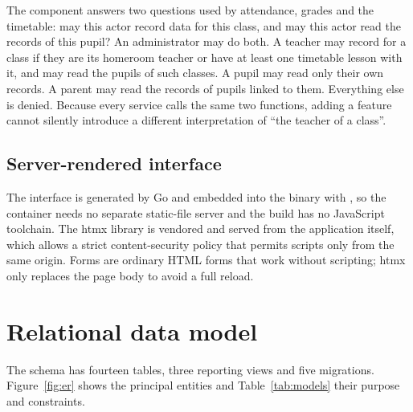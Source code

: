 The component  answers two questions used by attendance, grades and the timetable: may this actor record data for this class, and may this actor read the records of this pupil? An administrator may do both. A teacher may record for a class if they are its homeroom teacher or have at least one timetable lesson with it, and may read the pupils of such classes. A pupil may read only their own records. A parent may read the records of pupils linked to them. Everything else is denied. Because every service calls the same two functions, adding a feature cannot silently introduce a different interpretation of ``the teacher of a class''.

\subsection*{Server-rendered interface}

The interface is generated by Go  and embedded into the binary with , so the container needs no separate static-file server and the build has no JavaScript toolchain. The htmx library is vendored and served from the application itself, which allows a strict content-security policy that permits scripts only from the same origin. Forms are ordinary HTML forms that work without scripting; htmx only replaces the page body to avoid a full reload.

\section{Relational data model}

The schema has fourteen tables, three reporting views and five migrations. Figure~\ref{fig:er} shows the principal entities and Table~\ref{tab:models} their purpose and constraints.

